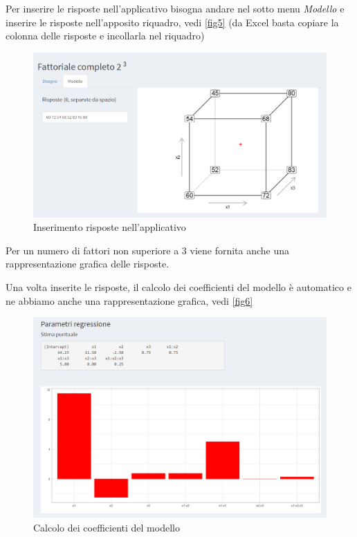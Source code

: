 \documentclass[
]{book}
\begin{document}
Per inserire le risposte nell'applicativo bisogna andare nel sotto menu \emph{Modello} e inserire le risposte nell'apposito riquadro, vedi \autoref{fig5} (da Excel basta copiare la colonna delle risposte e incollarla nel riquadro)

\begin{figure}

{\centering \includegraphics[width=1\linewidth]{Immagini/05_risp} 

}

\caption{Inserimento risposte nell'applicativo \label{fig5}}\label{fig:unnamed-chunk-9}
\end{figure}

Per un numero di fattori non superiore a 3 viene fornita anche una rappresentazione grafica delle risposte.

Una volta inserite le risposte, il calcolo dei coefficienti del modello è automatico e ne abbiamo anche una rappresentazione grafica, vedi \autoref{fig6}

\begin{figure}

{\centering \includegraphics[width=1\linewidth]{Immagini/06_coeff} 

}

\caption{Calcolo dei coefficienti del modello \label{fig6}}\label{fig:unnamed-chunk-10}
\end{figure}
\end{document}
